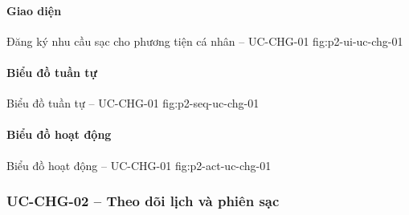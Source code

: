 \par\medskip
\noindent\begin{minipage}{\linewidth}
\paragraph{Giao diện}
  {Đăng ký nhu cầu sạc cho phương tiện cá nhân -- UC-CHG-01}
  {fig:p2-ui-uc-chg-01}
  {}
\end{minipage}\par

\clearpage
\paragraph{Biểu đồ tuần tự}
  {Biểu đồ tuần tự -- UC-CHG-01}
  {fig:p2-seq-uc-chg-01}

\clearpage
\paragraph{Biểu đồ hoạt động}
  {Biểu đồ hoạt động -- UC-CHG-01}
  {fig:p2-act-uc-chg-01}

\clearpage

\subsubsection{UC-CHG-02 -- Theo dõi lịch và phiên sạc}


